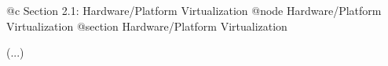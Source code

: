 @c Section 2.1: Hardware/Platform Virtualization
@node Hardware/Platform Virtualization
@section Hardware/Platform Virtualization

(...)
